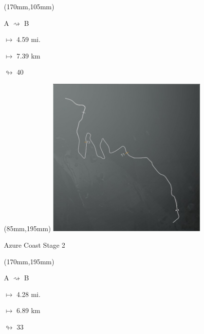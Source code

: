 \begin{textblock*}{30mm}(170mm,105mm)%
\par A $\rightsquigarrow$ B
\Large
\par$\mapsto$ 4.59 mi.
\par$\mapsto$ 7.39 km
\par$\looparrowright$ 40
\end{textblock*}
\begin{textblock*}{80mm}(85mm,195mm)%
\includegraphics[width=80mm]{TR/2015-05-20_00004.png}
\centerline{Azure Coast Stage 2}
\end{textblock*}
\begin{textblock*}{30mm}(170mm,195mm)%
\par A $\rightsquigarrow$ B
\Large
\par$\mapsto$ 4.28 mi.
\par$\mapsto$ 6.89 km
\par$\looparrowright$ 33
\end{textblock*}
\null\newpage

